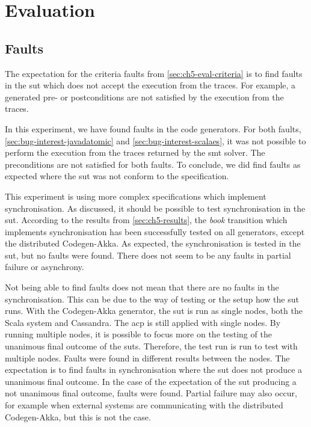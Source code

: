 \section{Evaluation}\label{sec:ch5-evaluation}

\subsection{Faults}
The expectation for the criteria faults from \autoref{sec:ch5-eval-criteria} is to
find faults in the \gls{sut} which does not accept the execution from the
traces. For example, a generated pre- or postconditions are not satisfied by
the execution from the traces.

In this experiment, we have found faults in the code generators. For both faults,
\autoref{sec:bug-interest-javadatomic} and \autoref{sec:bug-interest-scalaes},
it was not possible to perform the execution from the traces returned by the
\gls{smt} solver. The preconditions are not satisfied for both faults. To conclude,
we did find faults as expected where the \gls{sut} was not conform to the
specification.

This experiment is using more complex specifications which implement
synchronisation. As discussed, it should be possible to test synchronisation in
the \gls{sut}. According to the results from \autoref{sec:ch5-results}, the
\textit{book} transition which implements synchronisation has been successfully
tested on all generators, except the distributed Codegen-Akka. As expected, the
synchronisation is tested in the \gls{sut}, but no faults were found. There does
not seem to be any faults in partial failure or asynchrony.

Not being able to find faults does not mean that there are no faults in the
synchronisation. This can be due to the way of testing or the setup how the
\gls{sut} runs. With the Codegen-Akka generator, the \gls{sut} is run as single
nodes, both the Scala system and Cassandra.
The \gls{acp} is still applied with single nodes. By running multiple nodes, it
is possible to focus more on the testing of the unanimous final outcome of the
\gls{sut}s.
Therefore, the test run \label{sec:bug-dist-nodes} is run to test with multiple
nodes. Faults were found in different results between the nodes.
The expectation is to find faults in synchronisation where the \gls{sut} does not
produce a unanimous final outcome. In the case of the expectation of the
\gls{sut} producing a not unanimous final outcome, faults were found.
Partial failure may also occur, for example when external systems are
communicating with the distributed Codegen-Akka, but this is not the case.

